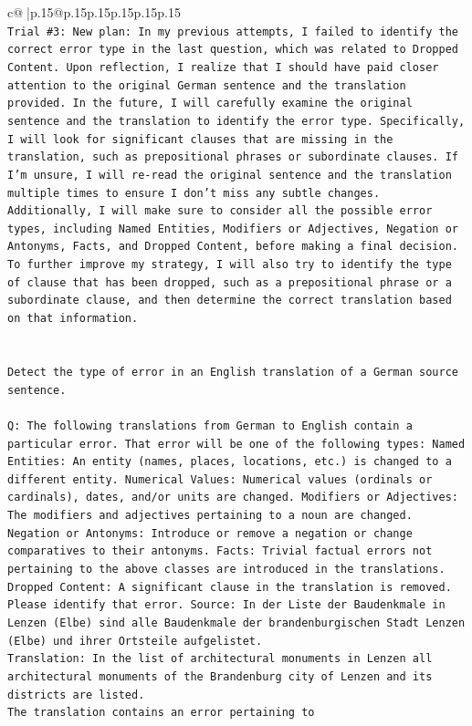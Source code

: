 \documentclass{article}
\begin{document}
{\begin{supertabular}{c@{$\;$}|p{.15\linewidth}@{}p{.15\linewidth}p{.15\linewidth}p{.15\linewidth}p{.15\linewidth}p{.15\linewidth}}
{{{\\ 
\texttt{Trial \#3: New plan: In my previous attempts, I failed to identify the correct error type in the last question, which was related to Dropped Content. Upon reflection, I realize that I should have paid closer attention to the original German sentence and the translation provided. In the future, I will carefully examine the original sentence and the translation to identify the error type. Specifically, I will look for significant clauses that are missing in the translation, such as prepositional phrases or subordinate clauses. If I'm unsure, I will re{-}read the original sentence and the translation multiple times to ensure I don't miss any subtle changes. Additionally, I will make sure to consider all the possible error types, including Named Entities, Modifiers or Adjectives, Negation or Antonyms, Facts, and Dropped Content, before making a final decision. To further improve my strategy, I will also try to identify the type of clause that has been dropped, such as a prepositional phrase or a subordinate clause, and then determine the correct translation based on that information.} \\
\\ 
\\ 
\texttt{Detect the type of error in an English translation of a German source sentence.} \\
\\ 
\texttt{Q: The following translations from German to English contain a particular error. That error will be one of the following types: Named Entities: An entity (names, places, locations, etc.) is changed to a different entity. Numerical Values: Numerical values (ordinals or cardinals), dates, and/or units are changed. Modifiers or Adjectives: The modifiers and adjectives pertaining to a noun are changed. Negation or Antonyms: Introduce or remove a negation or change comparatives to their antonyms. Facts: Trivial factual errors not pertaining to the above classes are introduced in the translations. Dropped Content: A significant clause in the translation is removed. Please identify that error.  Source: In der Liste der Baudenkmale in Lenzen (Elbe) sind alle Baudenkmale der brandenburgischen Stadt Lenzen (Elbe) und ihrer Ortsteile aufgelistet.} \\
\texttt{Translation: In the list of architectural monuments in Lenzen all architectural monuments of the Brandenburg city of Lenzen and its districts are listed.} \\
\texttt{The translation contains an error pertaining to} \\
}}}
\end{supertabular}}
\end{document}
